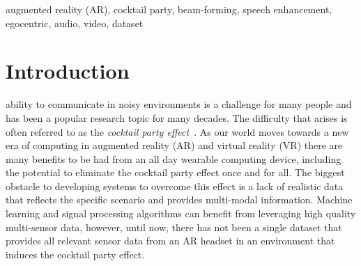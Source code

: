 \documentclass[journal]{IEEEtran}
\begin{document}
\begin{IEEEkeywords}
    augmented reality (AR), cocktail party, beam-forming, speech enhancement, egocentric, audio, video, dataset
\end{IEEEkeywords}
 
\IEEEpeerreviewmaketitle

\section{Introduction} \label{sec:Introduction}

 ability to communicate in noisy environments is a challenge for many people and has been a popular research topic for many decades.
The difficulty that arises is often referred to as the \emph{cocktail party effect}~\cite{cherry_experiments_1953,bronkhorst_cocktail_2000}.
As our world moves towards a new era of computing in augmented reality (AR) and virtual reality (VR) there are many benefits to be had from an all day wearable computing device, including the potential to eliminate the cocktail party effect once and for all.
The biggest obstacle to developing systems to overcome this effect is a lack of realistic data that reflects the specific scenario and provides multi-modal information.
Machine learning and signal processing algorithms can benefit from leveraging high quality multi-sensor data,
however, until now, there has not been a single dataset that provides all relevant sensor data from an AR headset in an environment that induces the cocktail party effect.
\end{document}
